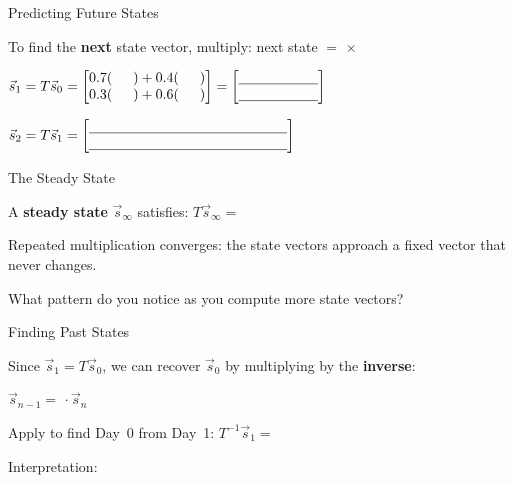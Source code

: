 \documentclass[10pt]{article}
\begin{document}
\vspace{0.06in}

\begin{notesbox}{Predicting Future States}

To find the \textbf{next} state vector, multiply: \quad next state $= $ \blank{1.5cm} $\times$ \blank{1.5cm}

\vspace{8pt}
$\vec{s}_1 = T\vec{s}_0
= \begin{bmatrix}0.7(\phantom{000})+0.4(\phantom{000}) \\ 0.3(\phantom{000})+0.6(\phantom{000})\end{bmatrix}
= \begin{bmatrix}\blank{2cm} \\ \blank{2cm}\end{bmatrix}$

\vspace{10pt}
$\vec{s}_2 = T\vec{s}_1
= \begin{bmatrix}\blank{5cm} \\ \blank{5cm}\end{bmatrix}$

\end{notesbox}

\vspace{0.06in}

\begin{notesbox}{The Steady State}

A \textbf{steady state} $\vec{s}_\infty$ satisfies: $T\vec{s}_\infty = $ \blank{2cm}

\vspace{6pt}
Repeated multiplication converges: the state vectors approach a fixed vector that never changes.

\vspace{6pt}
What pattern do you notice as you compute more state vectors? \writeline

\end{notesbox}

\vspace{0.06in}

\begin{notesbox}{Finding Past States}

Since $\vec{s}_1 = T\vec{s}_0$, we can recover $\vec{s}_0$ by multiplying by the \textbf{inverse}:

\vspace{6pt}
$\vec{s}_{n-1} = $ \blank{2cm} $\cdot\, \vec{s}_n$

\vspace{8pt}
Apply to find Day~0 from Day~1: $T^{-1}\vec{s}_1 = $ \blank{5cm}

\vspace{6pt}
Interpretation: \writeline

\end{notesbox}
\end{document}
